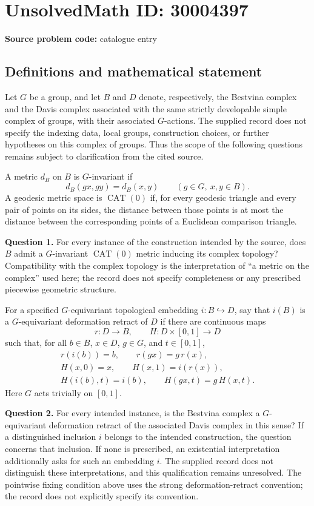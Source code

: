 \documentclass[11pt]{article}
\begin{document}
\section*{UnsolvedMath ID: 30004397}
\textbf{Source problem code:} catalogue entry
\subsection{Definitions and mathematical statement}
Let \(G\) be a group, and let \(B\) and \(D\) denote, respectively, the Bestvina complex and the Davis complex associated with the same strictly developable simple complex of groups, with their associated \(G\)-actions. The supplied record does not specify the indexing data, local groups, construction choices, or further hypotheses on this complex of groups. Thus the scope of the following questions remains subject to clarification from the cited source.

A metric \(d_B\) on \(B\) is \(G\)-invariant if
\[
 d_B(gx,gy)=d_B(x,y)\qquad(g\in G,\ x,y\in B).
\]
A geodesic metric space is \(\operatorname{CAT}(0)\) if, for every geodesic triangle and every pair of points on its sides, the distance between those points is at most the distance between the corresponding points of a Euclidean comparison triangle.

\textbf{Question 1.} For every instance of the construction intended by the source, does \(B\) admit a \(G\)-invariant \(\operatorname{CAT}(0)\) metric inducing its complex topology? Compatibility with the complex topology is the interpretation of ``a metric on the complex'' used here; the record does not specify completeness or any prescribed piecewise geometric structure.

For a specified \(G\)-equivariant topological embedding \(i:B\hookrightarrow D\), say that \(i(B)\) is a \(G\)-equivariant deformation retract of \(D\) if there are continuous maps
\[
 r:D\longrightarrow B,\qquad H:D\times[0,1]\longrightarrow D
\]
such that, for all \(b\in B\), \(x\in D\), \(g\in G\), and \(t\in[0,1]\),
\[
\begin{gathered}
 r(i(b))=b,\qquad r(gx)=g\,r(x),\\
 H(x,0)=x,\qquad H(x,1)=i(r(x)),\\
 H(i(b),t)=i(b),\qquad H(gx,t)=g\,H(x,t).
\end{gathered}
\]
Here \(G\) acts trivially on \([0,1]\).

\textbf{Question 2.} For every intended instance, is the Bestvina complex a \(G\)-equivariant deformation retract of the associated Davis complex in this sense? If a distinguished inclusion \(i\) belongs to the intended construction, the question concerns that inclusion. If none is prescribed, an existential interpretation additionally asks for such an embedding \(i\). The supplied record does not distinguish these interpretations, and this qualification remains unresolved. The pointwise fixing condition above uses the strong deformation-retract convention; the record does not explicitly specify its convention.
\end{document}
